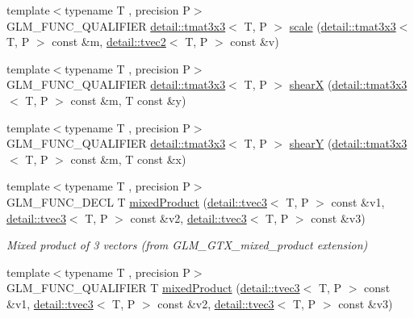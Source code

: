 \begin{DoxyCompactItemize}
\item 
{\footnotesize template$<$typename T , precision P$>$ }\\G\+L\+M\+\_\+\+F\+U\+N\+C\+\_\+\+Q\+U\+A\+L\+I\+F\+I\+ER \hyperlink{structglm_1_1detail_1_1tmat3x3}{detail\+::tmat3x3}$<$ T, P $>$ \hyperlink{group__gtx__matrix__transform__2d_gaf17588e16120250980b221c2ebdde0eb}{scale} (\hyperlink{structglm_1_1detail_1_1tmat3x3}{detail\+::tmat3x3}$<$ T, P $>$ const \&m, \hyperlink{structglm_1_1detail_1_1tvec2}{detail\+::tvec2}$<$ T, P $>$ const \&v)
\item 
{\footnotesize template$<$typename T , precision P$>$ }\\G\+L\+M\+\_\+\+F\+U\+N\+C\+\_\+\+Q\+U\+A\+L\+I\+F\+I\+ER \hyperlink{structglm_1_1detail_1_1tmat3x3}{detail\+::tmat3x3}$<$ T, P $>$ \hyperlink{group__gtx__matrix__transform__2d_gaeac73f42bba3e35100d9a43c40dc0f23}{shearX} (\hyperlink{structglm_1_1detail_1_1tmat3x3}{detail\+::tmat3x3}$<$ T, P $>$ const \&m, T const \&y)
\item 
{\footnotesize template$<$typename T , precision P$>$ }\\G\+L\+M\+\_\+\+F\+U\+N\+C\+\_\+\+Q\+U\+A\+L\+I\+F\+I\+ER \hyperlink{structglm_1_1detail_1_1tmat3x3}{detail\+::tmat3x3}$<$ T, P $>$ \hyperlink{group__gtx__matrix__transform__2d_ga04dd04815c1c8ee0bd49e6ae499d8252}{shearY} (\hyperlink{structglm_1_1detail_1_1tmat3x3}{detail\+::tmat3x3}$<$ T, P $>$ const \&m, T const \&x)
\item 
{\footnotesize template$<$typename T , precision P$>$ }\\G\+L\+M\+\_\+\+F\+U\+N\+C\+\_\+\+D\+E\+CL T \hyperlink{group__gtx__mixed__product_ga3c7ec94fdd2b088eac78fb4a0211f32d}{mixed\+Product} (\hyperlink{structglm_1_1detail_1_1tvec3}{detail\+::tvec3}$<$ T, P $>$ const \&v1, \hyperlink{structglm_1_1detail_1_1tvec3}{detail\+::tvec3}$<$ T, P $>$ const \&v2, \hyperlink{structglm_1_1detail_1_1tvec3}{detail\+::tvec3}$<$ T, P $>$ const \&v3)
\begin{DoxyCompactList}\small\item\em Mixed product of 3 vectors (from G\+L\+M\+\_\+\+G\+T\+X\+\_\+mixed\+\_\+product extension) \end{DoxyCompactList}\item 
{\footnotesize template$<$typename T , precision P$>$ }\\G\+L\+M\+\_\+\+F\+U\+N\+C\+\_\+\+Q\+U\+A\+L\+I\+F\+I\+ER T \hyperlink{group__gtx__mixed__product_ga3c7ec94fdd2b088eac78fb4a0211f32d}{mixed\+Product} (\hyperlink{structglm_1_1detail_1_1tvec3}{detail\+::tvec3}$<$ T, P $>$ const \&v1, \hyperlink{structglm_1_1detail_1_1tvec3}{detail\+::tvec3}$<$ T, P $>$ const \&v2, \hyperlink{structglm_1_1detail_1_1tvec3}{detail\+::tvec3}$<$ T, P $>$ const \&v3)

\end{DoxyCompactItemize}
